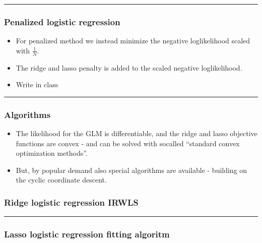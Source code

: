 \documentclass[
  letterpaper,
  DIV=11,
  numbers=noendperiod]{scrartcl}
\providecommand{\tightlist}{%
  \setlength{\itemsep}{0pt}\setlength{\parskip}{0pt}}\usepackage{longtable,booktabs,array}
\begin{document}
\begin{center}\rule{0.5\linewidth}{0.5pt}\end{center}

\hypertarget{penalized-logistic-regression}{%
\subsubsection{Penalized logistic
regression}\label{penalized-logistic-regression}}

\begin{itemize}
\item
  For penalized method we instead minimize the negative loglikelihood
  scaled with \(\frac{1}{N}\).
\item
  The ridge and lasso penalty is added to the scaled negative
  loglikelihood.
\item
  Write in class
\end{itemize}

\begin{center}\rule{0.5\linewidth}{0.5pt}\end{center}

\hypertarget{algorithms-1}{%
\subsubsection{Algorithms}\label{algorithms-1}}

\begin{itemize}
\tightlist
\item
  The likelihood for the GLM is differentiable, and the ridge and lasso
  objective functions are convex - and can be solved with socalled
  ``standard convex optimization methods''.
\item
  But, by popular demand also special algorithms are available -
  building on the cyclic coordinate descent.
\end{itemize}

\hypertarget{ridge-logistic-regression-irwls}{%
\subsubsection{Ridge logistic regression
IRWLS}\label{ridge-logistic-regression-irwls}}

\begin{center}\rule{0.5\linewidth}{0.5pt}\end{center}

\hypertarget{lasso-logistic-regression-fitting-algoritm}{%
\subsubsection{Lasso logistic regression fitting
algoritm}\label{lasso-logistic-regression-fitting-algoritm}}
\end{document}
